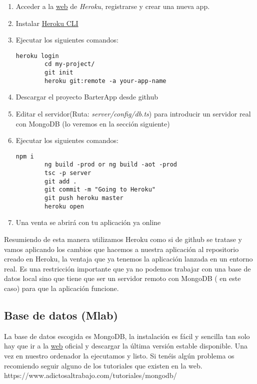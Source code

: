 \begin{enumerate}
	\item Acceder a la \hyperlink{https://www.heroku.com/}{web} de \emph{Heroku}, registrarse y crear una nueva app.
	\item Instalar \hyperlink{https://devcenter.heroku.com/articles/heroku-cli}{Heroku CLI}
	\item Ejecutar los siguientes comandos:
		\lstset{language=C, breaklines=true, basicstyle=\footnotesize}
		\begin{lstlisting}[frame=single]
		heroku login
		cd my-project/
		git init
		heroku git:remote -a your-app-name
    	\end{lstlisting}
	\item Descargar el proyecto BarterApp desde github 
	\item Editar el servidor(Ruta: \emph{server/config/db.ts}) para introducir un servidor real con MongoDB (lo veremos en la sección siguiente)
	\item Ejecutar los siguientes comandos:
		\lstset{language=C, breaklines=true, basicstyle=\footnotesize}
		\begin{lstlisting}[frame=single]
		npm i
		ng build -prod or ng build -aot -prod
		tsc -p server
		git add .
		git commit -m "Going to Heroku"
		git push heroku master
		heroku open
    	\end{lstlisting}
	\item Una venta se abrirá con tu aplicación ya online
\end{enumerate}

Resumiendo de esta manera utilizamos Heroku como si de github se tratase y vamos aplicando los cambios que hacemos a nuestra aplicación al repositorio creado en Heroku, la ventaja que ya tenemos la aplicación lanzada en un entorno real. Es una restricción importante que ya no podemos trabajar con una base de datos local sino que tiene que ser un servidor remoto con MongoDB ( en este caso) para que la aplicación funcione.
	

\subsection{Base de datos (Mlab)}
La base de datos escogida es MongoDB, la instalación es fácil y sencilla tan solo hay que ir a la \hyperlink{http://www.mongodb.org/downloads}{web} oficial y descargar la última versión estable disponible. Una vez en nuestro ordenador la ejecutamos y listo.  Si tenéis algún problema os recomiendo seguir alguno de los tutoriales que existen en la web. https://www.adictosaltrabajo.com/tutoriales/mongodb/

